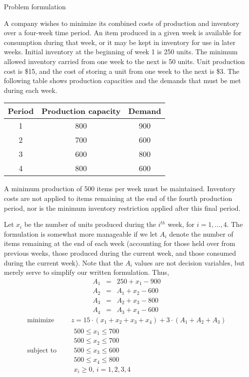 \documentclass[c]{beamer}
\begin{document}
\begin{frame}[allowframebreaks]{Problem formulation}
\framebreak

  \begin{Exercise}
  A company wishes to minimize its combined costs of production and inventory over a four-week time period. An item produced in a given week is available for consumption during that week, or it may be kept in inventory for use in later weeks. Initial inventory at the beginning of week 1 is 250 units. The minimum allowed inventory carried from one week to the next is 50 units. Unit production cost is \$15, and the cost of storing a unit from one week to the next is \$3. The following table shows production capacities and the demands that must be met during each week.\cite{carter}
    \begin{center}
    \begin{tabular}{ccc}
      Period  & Production capacity & Demand  \\\hline
      1 &  800 &  900 \\
      2 & 700 & 600\\
      3 & 600 & 800\\
      4 & 800 & 600
    \end{tabular}
  \end{center}
  A minimum production of 500 items per week must be maintained. Inventory costs are not applied to items remaining at the end of the fourth production period, nor is the minimum inventory restriction applied after this final period.
  \end{Exercise}
  \framebreak
  Let $x_i$ be the number of units produced during the $i^{th}$ week, for $i = 1, …, 4$. The formulation is somewhat more manageable if we let $A_i$ denote the number of items remaining at the end of each week (accounting for those held over from previous weeks, those produced during the current week, and those consumed during the current week). Note that the $A_i$ values are not decision variables, but merely serve to simplify our written formulation. Thus,
  \begin{eqnarray*}
    A_1&=&250+x_1-900\\
    A_2&=&A_1+x_2-600\\
    A_3&=&A_2+x_3-800\\
    A_4&=&A_3+x_4-600
  \end{eqnarray*}
  \begin{equation*}
    \begin{aligned}
      \text{minimize } \quad & z = 15\cdot(x_1+x_2+x_3+x_4)+3\cdot (A_1+A_2+A_3) \\
      \text{subject to }\quad &
      \begin{array}{c}
        500 \leq x_1 \leq 700\\
        500 \leq x_2 \leq 700\\
        500 \leq x_3 \leq 600\\
        500 \leq x_4 \leq 800\\
        x_i \geq 0, \, i=1,2,3,4
      \end{array}
    \end{aligned}
  \end{equation*}
\end{frame}
\end{document}
